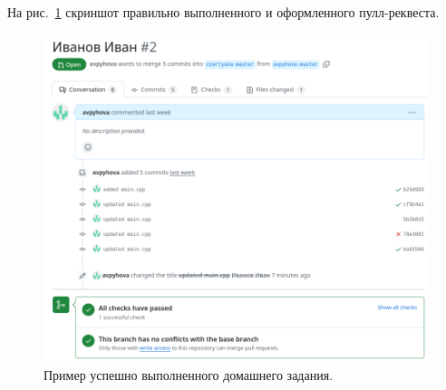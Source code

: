 \documentclass[14pt]{extarticle}
\begin{document}
    На рис.~\ref{fig:pr} скриншот правильно выполненного и оформленного пулл-реквеста.

    \begin{figure}[ht]
        \centering
        \includegraphics[width=\textwidth]{Homeworks/02-Git/pull-request.png}
        \caption{Пример успешно выполненного домашнего задания.}
        \label{fig:pr}
    \end{figure}

\clearpage
\end{document}
